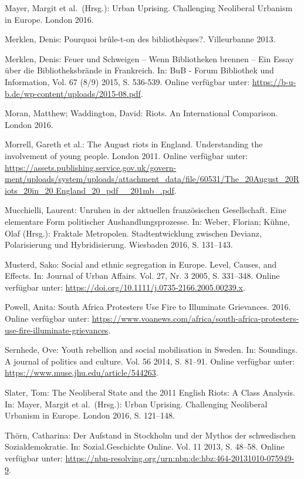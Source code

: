 \documentclass[a4paper,
fontsize=11pt,
oneside,
numbers=noperiodatend,
parskip=half-,
bibliography=totoc,
final
]{scrartcl}
\begin{document}
Mayer, Margit et al.~(Hrsg.): Urban Uprising. Challenging Neoliberal
Urbanism in Europe. London 2016.

Merklen, Denis: Pourquoi brûle-t-on des bibliothèques?. Villeurbanne
2013.

Merklen, Denis: Feuer und Schweigen -- Wenn Bibliotheken brennen -- Ein
Essay über die Bibliotheksbrände in Frankreich. In: BuB - Forum
Bibliothek und Information, Vol. 67 (8/9) 2015, S. 536-539. Online
verfügbar unter: \url{https://b-u-b.de/wp-content/uploads/2015-08.pdf}.

Moran, Matthew; Waddington, David: Riots. An International Comparison.
London 2016.

Morrell, Gareth et al.: The August riots in England. Understanding the
involvement of young people. London 2011. Online verfügbar unter:
\href{https://assets.publishing.service.gov.uk/government/uploads/system/uploads/attachment_data/file/60531/The_20August_20Riots_20in_20England_20_pdf__201mb_.pdf}{https://assets.publishing.service.gov.uk/govern-ment/uploads/system/uploads/attachment\_data/file/60531/The\_20August\_20Riots\_20in\_20 England\_20\_pdf\_\_201mb\_.pdf}.

Mucchielli, Laurent: Unruhen in der aktuellen französischen
Gesellschaft. Eine elementare Form politischer Aushandlungsprozesse. In:
Weber, Florian; Kühne, Olaf (Hrsg.): Fraktale Metropolen.
Stadtentwicklung zwischen Devianz, Polarisierung und Hybridisierung.
Wiesbaden 2016, S. 131--143.

Musterd, Sako: Social and ethnic segregation in Europe. Level, Causes,
and Effects. In: Journal of Urban Affairs. Vol. 27, Nr. 3 2005, S.
331--348. Online verfügbar unter:
\url{https://doi.org/10.1111/j.0735-2166.2005.00239.x}.

Powell, Anita: South Africa Protesters Use Fire to Illuminate
Grievances. 2016. Online verfügbar unter:
\url{https://www.voanews.com/africa/south-africa-protesters-use-fire-illuminate-grievances}.

Sernhede, Ove: Youth rebellion and social mobilisation in Sweden. In:
Soundings. A journal of politics and culture. Vol. 56 2014, S. 81--91.
Online verfügbar unter: \url{https://www.muse.jhu.edu/article/544263}.

Slater, Tom: The Neoliberal State and the 2011 English Riots: A Class
Analysis. In: Mayer, Margit et al.~(Hrsg.): Urban Uprising. Challenging
Neoliberal Urbanism in Europe. London 2016, S. 121--148.

Thörn, Catharina: Der Aufstand in Stockholm und der Mythos der
schwedischen Sozialdemokratie. In: Sozial.Geschichte Online. Vol. 11
2013, S. 48--58. Online verfügbar unter:
\url{https://nbn-resolving.org/urn:nbn:de:hbz:464-20131010-075949-9}.
\end{document}
